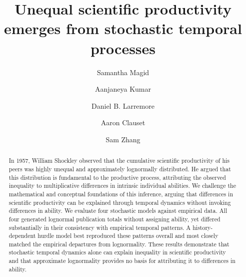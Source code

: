 \documentclass[9pt,twocolumn,twoside]{pnas-new}
\begin{document}
\raggedbottom

\title{Unequal scientific productivity emerges from stochastic temporal processes}

\author[a,1]{Samantha Magid}
\author[c]{Aanjaneya Kumar}
\author[d,c]{Daniel B. Larremore}
\author[d,c]{Aaron Clauset}
\author[a,b,c,d,1,2]{Sam Zhang}






\begin{abstract}
In 1957, William Shockley observed that the cumulative scientific productivity of his peers was highly unequal and approximately lognormally distributed. He argued that this distribution is fundamental to the productive process, attributing the observed inequality to multiplicative differences in intrinsic individual abilities. We challenge the mathematical and conceptual foundations of this inference, arguing that differences in scientific productivity can be explained through temporal dynamics without invoking differences in ability. We evaluate four stochastic models against empirical data. All four generated lognormal publication totals without assigning ability, yet differed substantially in their consistency with empirical temporal patterns. A history-dependent hurdle model best reproduced these patterns overall and most closely matched the empirical departures from lognormality. These results demonstrate that stochastic temporal dynamics alone can explain inequality in scientific productivity and that approximate lognormality provides no basis for attributing it to differences in ability.\end{abstract}
\end{document}
